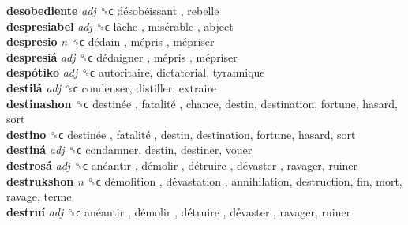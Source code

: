 \textbf{desobediente} \emph{adj}  ␝ϲ   désobéissant , rebelle  \\
\textbf{despresiabel} \emph{adj}  ␝ϲ   lâche ,  misérable , abject  \\
\textbf{despresio} \emph{n}  ␝ϲ   dédain ,  mépris ,  mépriser   \\
\textbf{despresiá} \emph{adj}  ␝ϲ   dédaigner ,  mépris ,  mépriser   \\
\textbf{despótiko} \emph{adj}  ␝ϲ  autoritaire, dictatorial, tyrannique  \\
\textbf{destilá} \emph{adj}  ␝ϲ  condenser, distiller, extraire  \\
\textbf{destinashon} ␝ϲ   destinée ,  fatalité , chance, destin, destination, fortune, hasard, sort  \\
\textbf{destino} ␝ϲ   destinée ,  fatalité , destin, destination, fortune, hasard, sort  \\
\textbf{destiná} \emph{adj}  ␝ϲ  condamner, destin, destiner, vouer  \\
\textbf{destrosá} \emph{adj}  ␝ϲ   anéantir ,  démolir ,  détruire ,  dévaster , ravager, ruiner  \\
\textbf{destrukshon} \emph{n}  ␝ϲ   démolition ,  dévastation , annihilation, destruction, fin, mort, ravage, terme  \\
\textbf{destruí} \emph{adj}  ␝ϲ   anéantir ,  démolir ,  détruire ,  dévaster , ravager, ruiner  \\
